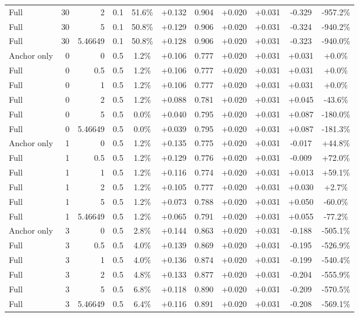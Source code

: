 \begin{table}[htbp]
\begin{tabular}{lrrrccccccc}
Full & 30 & 2 & 0.1 & 51.6\% & +0.132 & 0.904 & +0.020 & +0.031 & -0.329 & -957.2\% \\
Full & 30 & 5 & 0.1 & 50.8\% & +0.129 & 0.906 & +0.020 & +0.031 & -0.324 & -940.2\% \\
Full & 30 & 5.46649 & 0.1 & 50.8\% & +0.128 & 0.906 & +0.020 & +0.031 & -0.323 & -940.0\% \\
Anchor only & 0 & 0 & 0.5 & 1.2\% & +0.106 & 0.777 & +0.020 & +0.031 & +0.031 & +0.0\% \\
Full & 0 & 0.5 & 0.5 & 1.2\% & +0.106 & 0.777 & +0.020 & +0.031 & +0.031 & +0.0\% \\
Full & 0 & 1 & 0.5 & 1.2\% & +0.106 & 0.777 & +0.020 & +0.031 & +0.031 & +0.0\% \\
Full & 0 & 2 & 0.5 & 1.2\% & +0.088 & 0.781 & +0.020 & +0.031 & +0.045 & -43.6\% \\
Full & 0 & 5 & 0.5 & 0.0\% & +0.040 & 0.795 & +0.020 & +0.031 & +0.087 & -180.0\% \\
Full & 0 & 5.46649 & 0.5 & 0.0\% & +0.039 & 0.795 & +0.020 & +0.031 & +0.087 & -181.3\% \\
Anchor only & 1 & 0 & 0.5 & 1.2\% & +0.135 & 0.775 & +0.020 & +0.031 & -0.017 & +44.8\% \\
Full & 1 & 0.5 & 0.5 & 1.2\% & +0.129 & 0.776 & +0.020 & +0.031 & -0.009 & +72.0\% \\
Full & 1 & 1 & 0.5 & 1.2\% & +0.116 & 0.774 & +0.020 & +0.031 & +0.013 & +59.1\% \\
Full & 1 & 2 & 0.5 & 1.2\% & +0.105 & 0.777 & +0.020 & +0.031 & +0.030 & +2.7\% \\
Full & 1 & 5 & 0.5 & 1.2\% & +0.073 & 0.788 & +0.020 & +0.031 & +0.050 & -60.0\% \\
Full & 1 & 5.46649 & 0.5 & 1.2\% & +0.065 & 0.791 & +0.020 & +0.031 & +0.055 & -77.2\% \\
Anchor only & 3 & 0 & 0.5 & 2.8\% & +0.144 & 0.863 & +0.020 & +0.031 & -0.188 & -505.1\% \\
Full & 3 & 0.5 & 0.5 & 4.0\% & +0.139 & 0.869 & +0.020 & +0.031 & -0.195 & -526.9\% \\
Full & 3 & 1 & 0.5 & 4.0\% & +0.136 & 0.874 & +0.020 & +0.031 & -0.199 & -540.4\% \\
Full & 3 & 2 & 0.5 & 4.8\% & +0.133 & 0.877 & +0.020 & +0.031 & -0.204 & -555.9\% \\
Full & 3 & 5 & 0.5 & 6.8\% & +0.118 & 0.890 & +0.020 & +0.031 & -0.209 & -570.5\% \\
Full & 3 & 5.46649 & 0.5 & 6.4\% & +0.116 & 0.891 & +0.020 & +0.031 & -0.208 & -569.1\% \\

\end{tabular}
\end{table}
